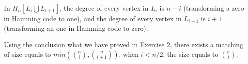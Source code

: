 In $H_{n}[L_i \bigcup L_{i+1}]$, the degree of every vertex in $L_i$ is $n - i$ (transforming a zero in Hamming code to  one), and the degree of every vertex in $L_{i+1}$ is $i + 1$ (transforming an one in Hamming code to zero).\par

Using the conclusion what we have proved in Exercise 2, there exists a matching of size equals to $min(\binom{n}{i}, \binom{n}{i+1})$. when $i < n / 2$, the size equals to $\binom{n}{i}$. 